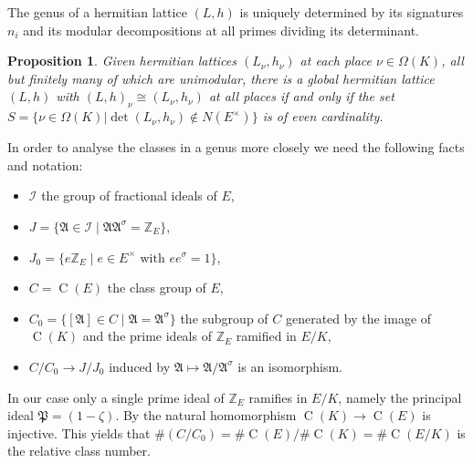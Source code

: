 \documentclass{amsart}
\theoremstyle{definition}
\theoremstyle{plain}
\newtheorem{proposition}[definition]{Proposition}
\DeclareMathOperator{\Cl}{C}
\newcommand{\ZZ}{\mathbb{Z}}
\begin{document}
The genus of a hermitian lattice $(L,h)$ is uniquely determined by its signatures $n_i$ and its modular decompositions at all primes dividing its determinant.
\begin{proposition}\cite[3.4.2 (3) and 3.5.6]{kirschmer:hermitian}\label{prop:existence-herm}
Given hermitian lattices $(L_\nu,h_\nu)$ at each place $\nu \in \Omega(K)$, all but finitely many of which are unimodular, there is a global hermitian lattice $(L,h)$ with
$(L,h)_\nu \cong (L_\nu,h_\nu)$ at all places if and only if
the set $S=\{ \nu \in \Omega(K) | \det (L_\nu,h_\nu) \not \in N(E^\times) \}$
is of even cardinality.
\end{proposition}
In order to analyse the classes in a genus more closely we need the following facts and notation:
\begin{itemize}
\setlength{\itemsep}{2pt}
 \item $\mathcal{I}$ the group of fractional ideals of $E$,
 \item $J = \{\mathfrak{A} \in \mathcal{I} \mid \mathfrak{A}\mathfrak{A}^\sigma = \ZZ_E\}$,
 \item $J_0 = \{e \ZZ_E \mid e \in E^\times \mbox{ with } ee^\sigma =1\}$,
 \item $C=\Cl(E)$ the class group of $E$,
 \item $C_0=\{ [\mathfrak{A}] \in C \mid \mathfrak{A}=\mathfrak{A}^\sigma\}$ the subgroup of $C$ generated by the image of $\Cl(K)$ and the prime ideals of $\ZZ_E$ ramified in $E/K$,
 \item $C/C_0 \rightarrow J/J_0$ induced by $\mathfrak{A} \mapsto \mathfrak{A}/\mathfrak{A}^\sigma$ is an isomorphism.
 \end{itemize}

In our case only a single prime ideal of $\ZZ_E$ ramifies in $E/K$, namely the principal ideal
$\mathfrak{P}=(1-\zeta)$. By \cite[Thm.\ 4.14]{washington:cyclotomic_fields} the natural
homomorphism $\Cl(K) \rightarrow \Cl(E)$ is injective.
This yields that $\#(C/C_0)=\#\Cl(E)/\#\Cl(K)=\#\Cl(E/K)$ is the relative
class number.
\end{document}
